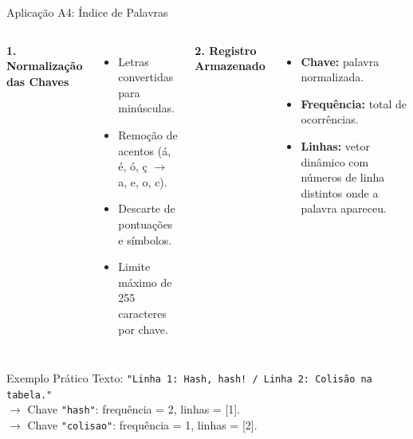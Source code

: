 \documentclass[aspectratio=169,11pt]{beamer}
\begin{document}
\begin{frame}{Aplicação A4: Índice de Palavras}
  \small
  \begin{columns}[T]
      \textbf{1. Normalização das Chaves}
      \begin{itemize}
        \item Letras convertidas para minúsculas.
        \item Remoção de acentos (\'a, \'e, \'o, \c{c} $\rightarrow$ a, e, o, c).
        \item Descarte de pontuações e símbolos.
        \item Limite máximo de 255 caracteres por chave.
      \end{itemize}

      \textbf{2. Registro Armazenado}
      \begin{itemize}
        \item \textbf{Chave:} palavra normalizada.
        \item \textbf{Frequência:} total de ocorrências.
        \item \textbf{Linhas:} vetor dinâmico com números de linha distintos onde a palavra apareceu.
      \end{itemize}
  \end{columns}

  \vspace{0.8em}
  \normalsize
  \begin{exampleblock}{Exemplo Prático}
    Texto: \texttt{"Linha 1: Hash, hash! / Linha 2: Colisão na tabela."}\\
    $\rightarrow$ Chave \texttt{"hash"}: frequência = 2, linhas = [1].\\
    $\rightarrow$ Chave \texttt{"colisao"}: frequência = 1, linhas = [2].
  \end{exampleblock}
\end{frame}
\end{document}
